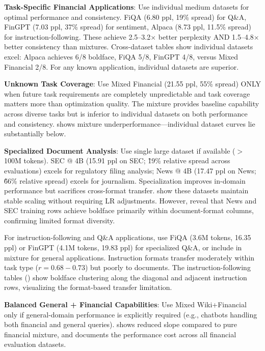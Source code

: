 \textbf{Task-Specific Financial Applications}: Use individual medium datasets for optimal performance and consistency. FiQA (6.80 ppl, 19\% spread) for Q\&A, FinGPT (7.03 ppl, 37\% spread) for sentiment, Alpaca (8.73 ppl, 11.5\% spread) for instruction-following. These achieve 2.5–3.2$\times$ better perplexity AND 1.5–4.8$\times$ better consistency than mixtures. Cross-dataset tables show individual datasets excel: Alpaca achieves 6/8 boldface, FiQA 5/8, FinGPT 4/8, versus Mixed Financial 2/8. For any known application, individual datasets are superior.

\textbf{Unknown Task Coverage}: Use Mixed Financial (21.55 ppl, 55\% spread) ONLY when future task requirements are completely unpredictable and task coverage matters more than optimization quality. The mixture provides baseline capability across diverse tasks but is inferior to individual datasets on both performance and consistency.  shows mixture underperformance—individual dataset curves lie substantially below.

\textbf{Specialized Document Analysis}: Use single large dataset if available ($>$ 100M tokens). SEC @ 4B (15.91 ppl on SEC; \~19\% relative spread across evaluations) excels for regulatory filing analysis; News @ 4B (17.47 ppl on News; \~66\% relative spread) excels for journalism. Specialization improves in-domain performance but sacrifices cross-format transfer.  show these datasets maintain stable scaling without requiring LR adjustments. However,  reveal that News and SEC training rows achieve boldface primarily within document-format columns, confirming limited format diversity.

For instruction-following and Q\&A applications, use FiQA (3.6M tokens, 16.35 ppl) or FinGPT (4.1M tokens, 19.83 ppl) for specialized Q\&A, or include in mixture for general applications. Instruction formats transfer moderately within task type ($r = 0.68-0.73$) but poorly to documents. The instruction-following tables () show boldface clustering along the diagonal and adjacent instruction rows, visualizing the format-based transfer limitation.

\textbf{Balanced General + Financial Capabilities}: Use Mixed Wiki+Financial only if general-domain performance is explicitly required (e.g., chatbots handling both financial and general queries).  shows reduced slope compared to pure financial mixture, and  documents the performance cost across all financial evaluation datasets.

